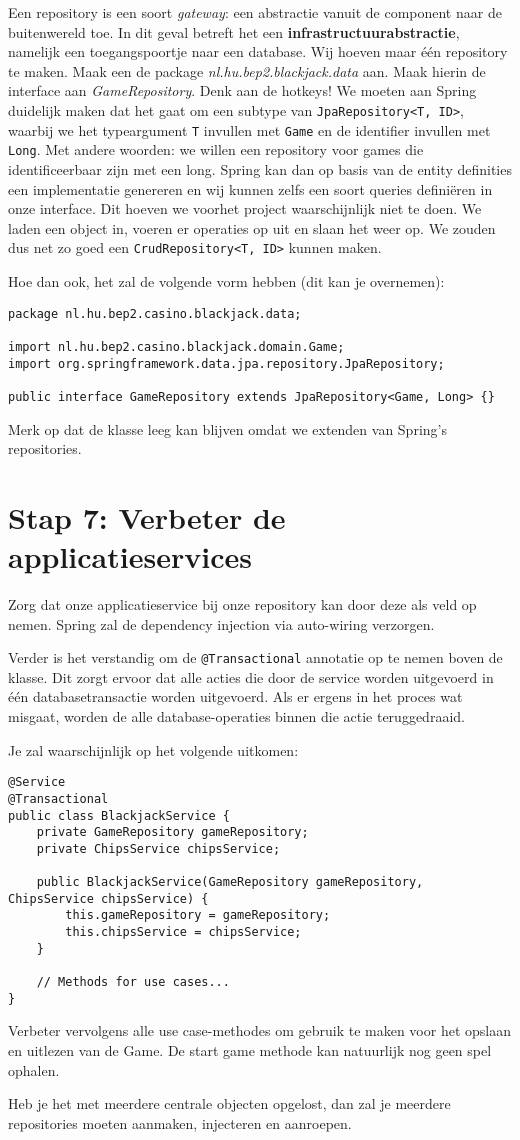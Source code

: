 Een repository is een soort \textit{gateway}: een abstractie vanuit de component naar de buitenwereld toe.
In dit geval betreft het een \textbf{infrastructuurabstractie}, namelijk een toegangspoortje naar een database.
Wij hoeven maar één repository te maken. Maak een de package \textit{nl.hu.bep2.blackjack.data} aan.
Maak hierin de interface aan \textit{GameRepository}. Denk aan de hotkeys!
We moeten aan Spring duidelijk maken dat het gaat om een subtype van \texttt{JpaRepository<T, ID>},
waarbij we het typeargument \texttt{T} invullen met \texttt{Game} en de identifier invullen met \texttt{Long}.
Met andere woorden: we willen een repository voor games die identificeerbaar zijn met een long.
Spring kan dan op basis van de entity definities een implementatie genereren en wij kunnen zelfs 
een soort queries definiëren in onze interface. 
Dit hoeven we voorhet project waarschijnlijk niet te doen.
We laden een object in, voeren er operaties op uit en slaan het weer op. 
We zouden dus net zo goed een \texttt{CrudRepository<T, ID>}
kunnen maken. 

Hoe dan ook, het zal de volgende vorm hebben 
(dit kan je overnemen):
\begin{verbatim}
package nl.hu.bep2.casino.blackjack.data;

import nl.hu.bep2.casino.blackjack.domain.Game;
import org.springframework.data.jpa.repository.JpaRepository;

public interface GameRepository extends JpaRepository<Game, Long> {}
\end{verbatim}

Merk op dat de klasse leeg kan blijven omdat we extenden van Spring's repositories.

\section{Stap 7: Verbeter de applicatieservices}
Zorg dat onze applicatieservice bij onze repository kan door 
deze als veld op nemen. Spring zal de dependency injection via 
auto-wiring verzorgen.

Verder is het verstandig om de \texttt{@Transactional} annotatie 
op te nemen boven de klasse. Dit zorgt ervoor dat alle acties 
die door de service worden uitgevoerd in één databasetransactie 
worden uitgevoerd. Als er ergens in het proces wat misgaat, worden 
de alle database-operaties binnen die actie teruggedraaid.

Je zal waarschijnlijk op het volgende uitkomen:
\begin{verbatim}
@Service
@Transactional
public class BlackjackService {
    private GameRepository gameRepository;
    private ChipsService chipsService;

    public BlackjackService(GameRepository gameRepository, ChipsService chipsService) {
        this.gameRepository = gameRepository;
        this.chipsService = chipsService;
    }
    
    // Methods for use cases...
}
\end{verbatim}

Verbeter vervolgens alle use case-methodes om gebruik te maken voor het 
opslaan en uitlezen van de Game. De start game methode kan natuurlijk nog geen 
spel ophalen.

Heb je het met meerdere centrale objecten opgelost, 
dan zal je meerdere repositories moeten 
aanmaken, injecteren en aanroepen.